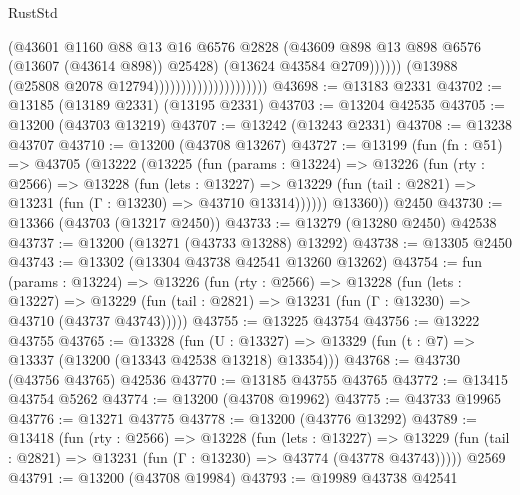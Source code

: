 \begin{lexlean}{RustStd}
\begin{coremodule}
                                                  (@43601
                                                    @1160
                                                    @88
                                                    @13
                                                    @16
                                                    @6576
                                                    @2828
                                                    (@43609
                                                      @898
                                                      @13
                                                      @898
                                                      @6576
                                                      (@13607 (@43614 @898))
                                                      @25428)
                                                    (@13624 @43584 @2709))))))
                                          (@13988 (@25808 @2078 @12794)))))))))))))))))))))
@43698 := @13183 @2331
@43702 := @13185 (@13189 @2331) (@13195 @2331)
@43703 := @13204 @42535
@43705 := @13200 (@43703 @13219)
@43707 := @13242 (@13243 @2331)
@43708 := @13238 @43707
@43710 := @13200 (@43708 @13267)
@43727 := @13199
    (fun (fn : @51) =>
    @43705
      (@13222
        (@13225
          (fun (params : @13224) =>
          @13226
            (fun (rty : @2566) =>
            @13228
              (fun (lets : @13227) =>
              @13229 (fun (tail : @2821) => @13231 (fun (Γ : @13230) => @43710 @13314))))))
        @13360))
    @2450
@43730 := @13366 (@43703 (@13217 @2450))
@43733 := @13279 (@13280 @2450) @42538
@43737 := @13200 (@13271 (@43733 @13288) @13292)
@43738 := @13305 @2450
@43743 := @13302 (@13304 @43738 @42541 @13260 @13262)
@43754 := fun (params : @13224) =>
  @13226
    (fun (rty : @2566) =>
    @13228
      (fun (lets : @13227) =>
      @13229 (fun (tail : @2821) => @13231 (fun (Γ : @13230) => @43710 (@43737 @43743)))))
@43755 := @13225 @43754
@43756 := @13222 @43755
@43765 := @13328
    (fun (U : @13327) => @13329 (fun (t : @7) => @13337 (@13200 (@13343 @42538 @13218) @13354)))
@43768 := @43730 (@43756 @43765) @42536
@43770 := @13185 @43755 @43765
@43772 := @13415 @43754 @5262
@43774 := @13200 (@43708 @19962)
@43775 := @43733 @19965
@43776 := @13271 @43775
@43778 := @13200 (@43776 @13292)
@43789 := @13418
    (fun (rty : @2566) =>
    @13228
      (fun (lets : @13227) =>
      @13229 (fun (tail : @2821) => @13231 (fun (Γ : @13230) => @43774 (@43778 @43743)))))
    @2569
@43791 := @13200 (@43708 @19984)
@43793 := @19989 @43738 @42541

\end{coremodule}
\end{lexlean}
